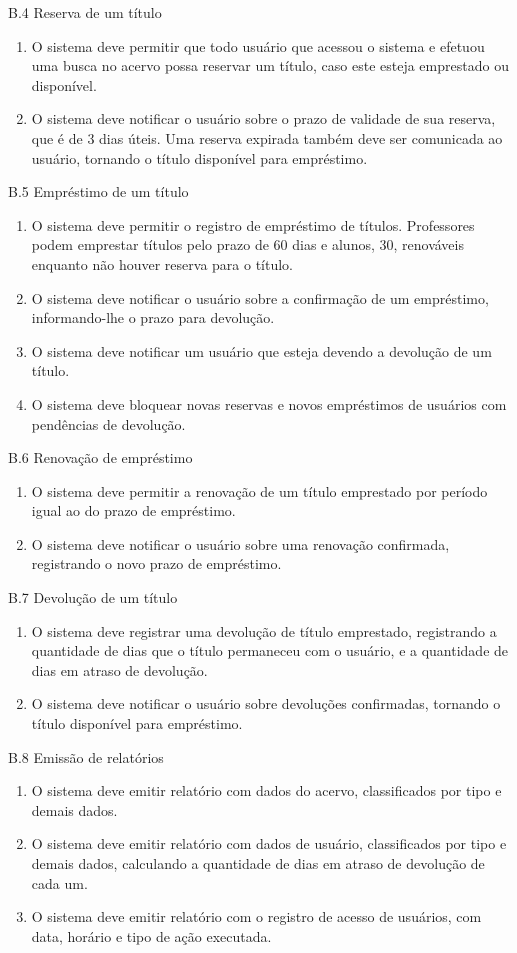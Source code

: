 \documentclass[a4paper]{article}
\begin{document}
	B.4 Reserva de um título
		\begin{enumerate}[resume]
			\item O sistema deve permitir que todo usuário que acessou o sistema e efetuou uma busca no acervo possa reservar um título, caso este esteja emprestado ou disponível.
			\item O sistema deve notificar o usuário sobre o prazo de validade de sua reserva, que é de 3 dias úteis. Uma reserva expirada também deve ser comunicada ao usuário, tornando o título disponível para empréstimo.
		\end{enumerate}
	B.5 Empréstimo de um título
		\begin{enumerate}[resume]
			\item O sistema deve permitir o registro de empréstimo de títulos. Professores podem emprestar títulos pelo prazo de 60 dias e alunos, 30, renováveis enquanto não houver reserva para o título.
			\item O sistema deve notificar o usuário sobre a confirmação de um empréstimo, informando-lhe o prazo para devolução.
			\item O sistema deve notificar um usuário que esteja devendo a devolução de um título.
			\item O sistema deve bloquear novas reservas e novos empréstimos de usuários com pendências de devolução.
		\end{enumerate}
	B.6 Renovação de empréstimo
		\begin{enumerate}[resume]
			\item O sistema deve permitir a renovação de um título emprestado por período igual ao do prazo de empréstimo.
			\item O sistema deve notificar o usuário sobre uma renovação confirmada, registrando o novo prazo de empréstimo.
		\end{enumerate}
	B.7 Devolução de um título
		\begin{enumerate}[resume]
			\item O sistema deve registrar uma devolução de título emprestado, registrando a quantidade de dias que o título permaneceu com o usuário, e a quantidade de dias em atraso de devolução.
			\item O sistema deve notificar o usuário sobre devoluções confirmadas, tornando o título disponível para empréstimo.
		\end{enumerate}
	B.8 Emissão de relatórios
		\begin{enumerate}[resume]
			\item O sistema deve emitir relatório com dados do acervo, classificados por tipo e demais dados.
			\item O sistema deve emitir relatório com dados de usuário, classificados por tipo e demais dados, calculando a quantidade de dias em atraso de devolução de cada um.
			\item O sistema deve emitir relatório com o registro de acesso de usuários, com data, horário e tipo de ação executada.
		\end{enumerate}
\end{document}

